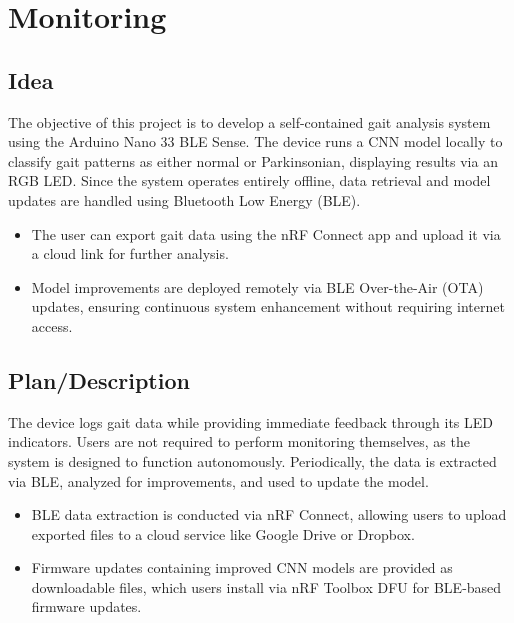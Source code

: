%
%
%

\chapter{Monitoring}

\section{Idea}
The objective of this project is to develop a self-contained gait analysis system using the Arduino Nano 33 BLE Sense. The device runs a CNN model locally to classify gait patterns as either normal or Parkinsonian, displaying results via an RGB LED. Since the system operates entirely offline, data retrieval and model updates are handled using Bluetooth Low Energy (BLE).

\begin{itemize}
	\item The user can export gait data using the nRF Connect app and upload it via a cloud link for further analysis.\cite{nordic2021nrfconnect}
	\item Model improvements are deployed remotely via BLE Over-the-Air (OTA) updates, ensuring continuous system enhancement without requiring internet access.\cite{nordic2021ota}
\end{itemize}

\section{Plan/Description}
The device logs gait data while providing immediate feedback through its LED indicators. Users are not required to perform monitoring themselves, as the system is designed to function autonomously. Periodically, the data is extracted via BLE, analyzed for improvements, and used to update the model.

\begin{itemize}
	\item BLE data extraction is conducted via nRF Connect, allowing users to upload exported files to a cloud service like Google Drive or Dropbox.
	\item Firmware updates containing improved CNN models are provided as downloadable files, which users install via nRF Toolbox DFU for BLE-based firmware updates.
\end{itemize}

